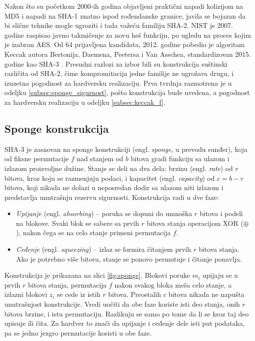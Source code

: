 Nakon što su početkom 2000-ih godina objavljeni praktični napadi kolizijom na MD5 i napadi na SHA-1 znatno ispod rođendanske granice, javila se bojazan da bi slične tehnike mogle ugroziti i tada važeću familiju SHA-2. NIST je 2007. godine raspisao javno takmičenje za novu heš funkciju, po ugledu na proces kojim je izabran AES. Od 64 prijavljena kandidata, 2012. godine pobedio je algoritam Keccak autora Bertonija, Daemena, Peetersa i Van Asschea, standardizovan 2015. godine kao SHA-3 \cite{fips202, keccak}. Presudni razlozi za izbor bili su konstrukcija suštinski različita od SHA-2, čime kompromitacija jedne familije ne ugrožava drugu, i izuzetna pogodnost za hardversku realizaciju. Prva tvrdnja razmotrena je u odeljku \ref{subsec:sponge_sigurnost}, pošto konstrukcija bude uvedena, a pogodnost za hardversku realizaciju u odeljku \ref{subsec:keccak_f}.

\subsection{Sponge konstrukcija}
\label{subsec:sponge}

SHA-3 je zasnovan na sponge konstrukciji (engl. \textit{sponge}, u prevodu sunđer), koja od fiksne permutacije $f$ nad stanjem od $b$ bitova gradi funkciju sa ulazom i izlazom proizvoljne dužine. Stanje se deli na dva dela: brzinu (engl. \textit{rate}) od $r$ bitova, kroz koju se razmenjuju podaci, i kapacitet (engl. \textit{capacity}) od $c = b - r$ bitova, koji nikada ne dolazi u neposredan dodir sa ulazom niti izlazom i predstavlja unutrašnju rezervu sigurnosti. Konstrukcija radi u dve faze:
\begin{itemize}[itemsep=2pt]
    \item \textit{Upijanje} (engl. \textit{absorbing}) -- poruka se dopuni do umnoška $r$ bitova i podeli na blokove. Svaki blok se sabere sa prvih $r$ bitova stanja operacijom XOR ($\oplus$), nakon čega se na celo stanje primeni permutacija $f$.
    \item \textit{Ceđenje} (engl. \textit{squeezing}) -- izlaz se formira čitanjem prvih $r$ bitova stanja. Ako je potrebno više bitova, stanje se ponovo permutuje i čitanje ponavlja.
\end{itemize}
Konstrukcija je prikazana na slici \ref{fig:sponge}. Blokovi poruke $m_i$ upijaju se u prvih $r$ bitova stanja, permutacija $f$ nakon svakog bloka meša celo stanje, a izlazni blokovi $z_i$ se cede iz istih $r$ bitova. Preostalih $c$ bitova nikada ne napušta unutrašnjost konstrukcije. Vredi uočiti da obe faze koriste isti deo stanja, onih $r$ bitova brzine, i istu permutaciju. Razlikuju se samo po tome da li se kroz taj deo upisuje ili čita. Za hardver to znači da upijanje i ceđenje dele isti put podataka, pa se jedno jezgro permutacije koristi u obe faze.

